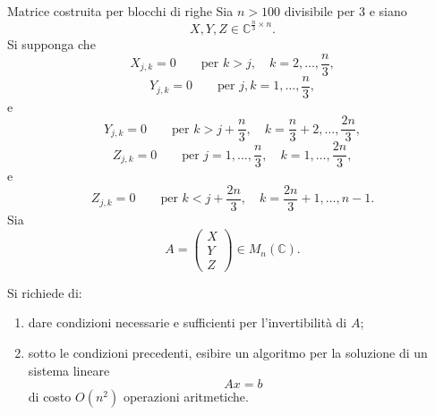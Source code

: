 \documentclass[a4paper]{article}
\begin{document}
\begin{snippetexercise}{Matrice costruita per blocchi di righe}
    Sia \(n>100\) divisibile per \(3\) e siano
    \[
        X,Y,Z\in \mathbb{C}^{\frac{n}{3}\times n}.
    \]
    Si supponga che
    \[
        X_{j,k}=0
        \qquad
        \text{per } k>j,\quad k=2,\dots,\frac{n}{3},
    \]
    \[
        Y_{j,k}=0
        \qquad
        \text{per } j,k=1,\dots,\frac{n}{3},
    \]
    e
    \[
        Y_{j,k}=0
        \qquad
        \text{per } k>j+\frac{n}{3},\quad k=\frac{n}{3}+2,\dots,\frac{2n}{3},
    \]
    \[
        Z_{j,k}=0
        \qquad
        \text{per } j=1,\dots,\frac{n}{3},\quad k=1,\dots,\frac{2n}{3},
    \]
    e
    \[
        Z_{j,k}=0
        \qquad
        \text{per } k<j+\frac{2n}{3},\quad k=\frac{2n}{3}+1,\dots,n-1.
    \]
    Sia
    \[
        A=
        \begin{pmatrix}
            X\\
            Y\\
            Z
        \end{pmatrix}
        \in M_n(\mathbb{C}).
    \]

    Si richiede di:
    \begin{enumerate}
        \item dare condizioni necessarie e sufficienti per l'invertibilità di \(A\);
        \item sotto le condizioni precedenti, esibire un algoritmo per la soluzione di un sistema lineare
            \[
                Ax=b
            \]
            di costo \(O(n^2)\) operazioni aritmetiche.
    \end{enumerate}
\end{snippetexercise}
\end{document}
